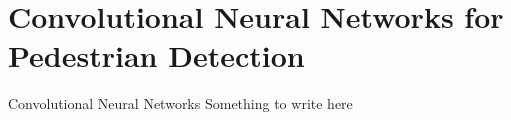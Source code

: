 \section{Convolutional Neural Networks for Pedestrian Detection}

\begin{frame}{Convolutional Neural Networks}
Something to write here
\end{frame}
